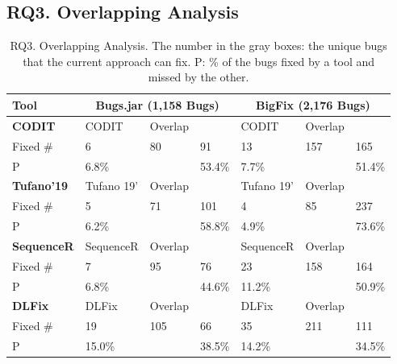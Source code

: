 \subsection{\bf RQ3. Overlapping Analysis}

{\footnotesize{
\begin{table}[t]
	\caption{RQ3. Overlapping Analysis. The number in the gray boxes: the unique bugs that the current approach can fix. P: \% of the bugs fixed by a tool and missed by the other.}
	\begin{center}
		\renewcommand{\arraystretch}{1}
		\begin{tabular}{p{1cm}<{\centering}|p{1.1cm}<{\centering}|p{0.8cm}<{\centering}|p{0.7cm}<{\centering}|p{1.1cm}<{\centering}|p{0.8cm}<{\centering}|p{0.7cm}<{\centering}}\hline
			Tool &\multicolumn{3}{c|}{Bugs.jar (1,158 Bugs)}&\multicolumn{3}{c}{BigFix (2,176 Bugs)}\\
			\hline
			{\bf CODIT}             & CODIT   & Overlap   & \tool  & CODIT   & Overlap   & {\tool} \\
			\hline
			Fixed \#     & \cellcolor{mygray} 6  & 80   & \cellcolor{mygray} 91  & \cellcolor{mygray} 13 &  157  & \cellcolor{mygray} 165 \\
			P            & 6.8\%   &    & 53.4\%  & 7.7\%   &    & 51.4\% \\
			\hline
			{\bf Tufano'19}             & Tufano 19'   & Overlap   & \tool  & Tufano 19'   & Overlap   & \tool \\
			\hline
			Fixed \#     & \cellcolor{mygray} 5  &  71  & \cellcolor{mygray} 101 & \cellcolor{mygray}4 & 85   & \cellcolor{mygray}237 \\
			P            &  6.2\%  &    &  58.8\% &  4.9\%  &    & 73.6\% \\
			\hline
			{\bf SequenceR}             & SequenceR   & Overlap   & \tool  & SequenceR   & Overlap   & \tool \\
			\hline
			Fixed \#     & \cellcolor{mygray} 7  &   95 & \cellcolor{mygray} 76 & \cellcolor{mygray} 23 &  158  & \cellcolor{mygray} 164 \\
			P            &   6.8\% &    & 44.6\%  &   11.2\% &    & 50.9\% \\
			\hline
			{\bf DLFix} & DLFix   & Overlap   & \tool  & DLFix   & Overlap   & \tool \\
			\hline
			Fixed \#     & \cellcolor{mygray}  19 &  105  & \cellcolor{mygray} 66 & \cellcolor{mygray}35 &  211  & \cellcolor{mygray}111 \\
			P            &  15.0\%  &    & 38.5\%  &  14.2\%  &    &  34.5\%\\

\end{tabular}
\end{center}
\end{table}}}
